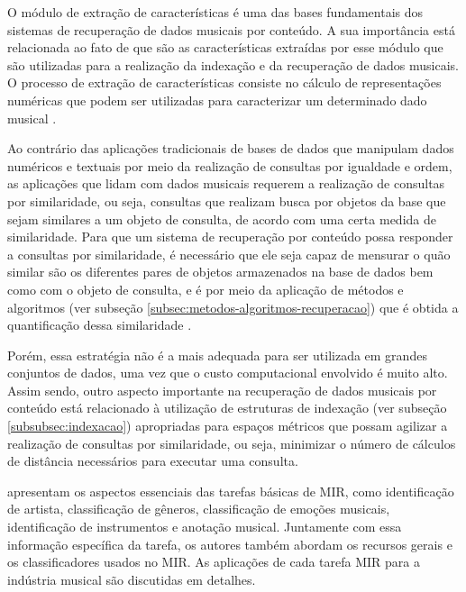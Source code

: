O módulo de extração de características é uma das bases fundamentais dos sistemas de recuperação de dados musicais por conteúdo. A sua importância está relacionada ao fato de que são as características extraídas por esse módulo que são utilizadas para a realização da indexação e da recuperação de dados musicais. O processo de extração de características consiste no cálculo de representações numéricas que podem ser utilizadas para caracterizar um determinado dado musical \cite{traina2003}.

Ao contrário das aplicações tradicionais de bases de dados que manipulam dados numéricos e textuais por meio da realização de consultas por igualdade e ordem, as aplicações que lidam com dados musicais requerem a realização de consultas por similaridade, ou seja, consultas que realizam busca por objetos da base que sejam similares a um objeto de consulta, de acordo com uma certa medida de similaridade. Para que um sistema de recuperação por conteúdo possa responder a consultas por similaridade, é necessário que ele seja capaz de mensurar o quão similar são os diferentes pares de objetos armazenados na base de dados bem como com o objeto de consulta, e é por meio da aplicação de métodos e algoritmos (ver subseção \ref{subsec:metodos-algoritmos-recuperacao}) que é obtida a quantificação dessa similaridade \cite{bohm2001, chavez2001}.

Porém, essa estratégia não é a mais adequada para ser utilizada em grandes conjuntos de dados, uma vez que o custo computacional envolvido é muito alto. Assim sendo, outro aspecto importante na recuperação de dados musicais por conteúdo está relacionado à utilização de estruturas de indexação (ver subseção \ref{subsubsec:indexacao}) apropriadas para espaços métricos que possam agilizar a realização de consultas por similaridade, ou seja, minimizar o número de cálculos de distância necessários para executar uma consulta.

 apresentam os aspectos essenciais das tarefas básicas de MIR, como identificação de artista, classificação de gêneros, classificação de emoções musicais, identificação de instrumentos e anotação musical. Juntamente com essa informação específica da tarefa, os autores também abordam os recursos gerais e os classificadores usados no MIR. As aplicações de cada tarefa MIR para a indústria musical são discutidas em detalhes.

